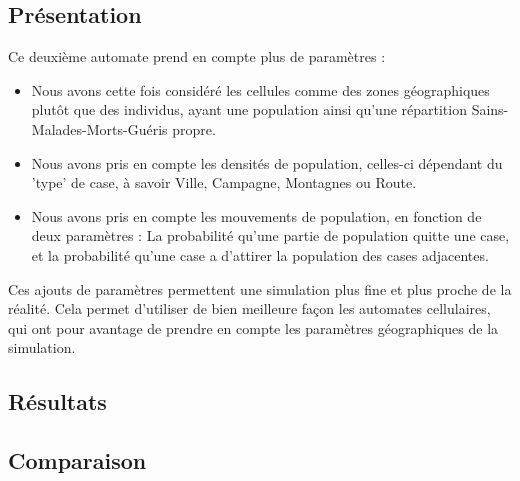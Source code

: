 \documentclass{article}
\begin{document}
\subsection{Présentation}
	Ce deuxième automate prend en compte plus de paramètres : 
	\begin{itemize}
	\item Nous avons cette fois considéré les cellules comme des zones géographiques plutôt que des individus, ayant une population ainsi qu'une répartition Sains-Malades-Morts-Guéris propre.
	\item Nous avons pris en compte les densités de population, celles-ci dépendant du 'type' de case, à savoir Ville, Campagne, Montagnes ou Route.
	\item Nous avons pris en compte les mouvements de population, en fonction de deux paramètres : La probabilité qu'une partie de population quitte une case, et la probabilité qu'une case a d'attirer la population des cases adjacentes.
	\end{itemize}
	
	Ces ajouts de paramètres permettent une simulation plus fine et plus proche de la réalité. Cela permet d'utiliser de bien meilleure façon les automates cellulaires, qui ont pour avantage de prendre en compte les paramètres géographiques de la simulation.


\subsection{Résultats}

\subsection{Comparaison}
\end{document}
